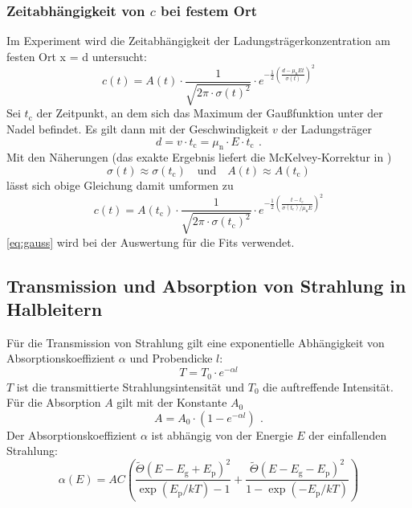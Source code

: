 \subsubsection*{Zeitabhängigkeit von $c$ bei festem Ort}
Im Experiment wird die Zeitabhängigkeit der Ladungsträgerkonzentration am festen Ort x = d untersucht:
\begin{equation}
\label{}
c(t) = A(t)
\cdot
\frac{1}{\sqrt{2  \pi  \cdot \sigma(t)^2}}
\cdot
e^{-\frac{1}{2}(\frac{d - \mu_{\text{n}} E t}{\sigma(t)})^2}
\end{equation}
Sei $t_{\text{c}}$ der Zeitpunkt, an dem sich das Maximum der Gaußfunktion unter der Nadel befindet.
Es gilt dann mit der Geschwindigkeit $v$ der Ladungsträger
\begin{equation}
\label{}
d = v \cdot t_{\text{c}} = \mu_{\text{n}} \cdot E \cdot t_{\text{c}} \ \, .
\end{equation}
Mit den Näherungen (das exakte Ergebnis liefert die McKelvey-Korrektur in \cite{staatsex})
\begin{equation}
\label{}
\sigma(t) \approx \sigma(t_{\text{c}}) \quad \text{und} \quad A(t) \approx A(t_{\text{c}})
\end{equation}
lässt sich obige Gleichung damit umformen zu
\begin{equation}
\label{eq:gauss}
c(t) = A(t_{\text{c}})
\cdot
\frac{1}{\sqrt{2  \pi  \cdot \sigma(t_{\text{c}})^2}}
\cdot
e^{-\frac{1}{2}(\frac{t - t_{\text{c}}}{\sigma(t_{\text{c}}) / \mu_{\text{n}} E})^2}
\end{equation}
\autoref{eq:gauss} wird bei der Auswertung für die Fits verwendet.


\subsection{Transmission und Absorption von Strahlung in Halbleitern}
Für die Transmission von Strahlung gilt eine exponentielle Abhängigkeit von Absorptionskoeffizient
$\alpha$ und Probendicke $l$:
\begin{equation}
\label{}
T = T_0 \cdot e^{-\alpha l}
\end{equation}
$T$ ist die transmittierte Strahlungsintensität und $T_0$ die auftreffende Intensität.
Für die Absorption $A$ gilt mit der Konstante $A_0$
\begin{equation}
\label{}
A = A_0 \cdot (1 - e^{-\alpha l}) \ \, .
\end{equation}
Der Absorptionskoeffizient $\alpha$ ist abhängig von der Energie $E$ der einfallenden Strahlung:
\begin{equation}
\label{}
\alpha(E) = AC \left(
\frac{\tilde{\Theta}(E-E_{\text{g}}+E_{\text{p}})^2}{\exp (E_{\text{p}}/kT)-1}+
\frac{\tilde{\Theta}(E-E_{\text{g}}-E_{\text{p}})^2}{1-\exp (-E_{\text{p}}/kT)}
\right)
\end{equation}

